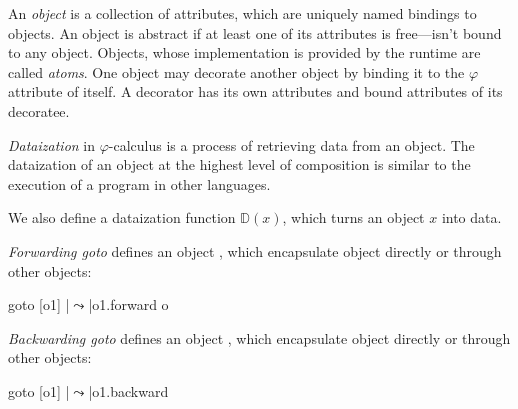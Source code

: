 
\begin{eodefinition}
An \emph{object} is a collection of attributes, which are uniquely named bindings to objects.
An object is abstract if at least one of its attributes is free---isn’t bound to any object.
Objects, whose implementation is provided by the runtime are called \emph{atoms}.
One object may decorate another object by binding it to the $\varphi$ attribute of itself.
A decorator has its own attributes and bound attributes of its decoratee.
\end{eodefinition}
\begin{eodefinition}
\emph{Dataization} in $\varphi$-calculus is a process of retrieving data from an object.
The dataization of an object at the highest level of composition is similar to the execution of a program in other languages.

We also define a dataization function $\mathbb{D}(x)$, which turns an object $x$ into data.
\end{eodefinition}
\begin{eodefinition}
\emph{Forwarding goto} defines an object , which encapsulate object  directly or through other objects:
\begin{ffcode}
goto
  [o1]
   |$\leadsto$|o1.forward o
\end{ffcode}
\end{eodefinition}
\begin{eodefinition}
\emph{Backwarding goto} defines an object , which encapsulate object  directly or through other objects:
\begin{ffcode}
goto
  [o1]
   |$\leadsto$|o1.backward
\end{ffcode}
\end{eodefinition}

